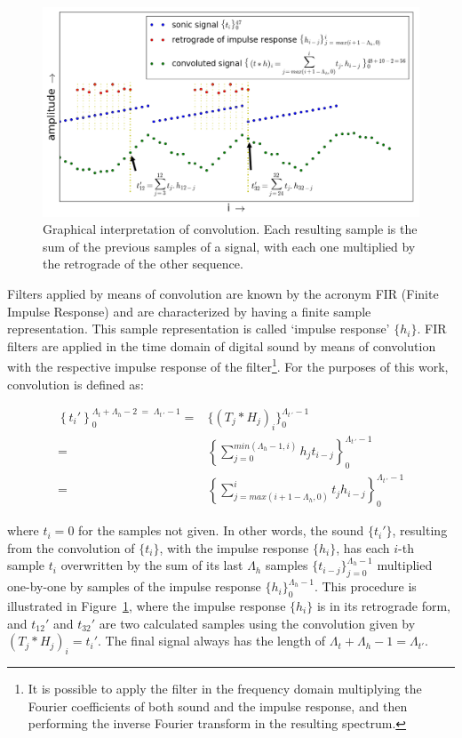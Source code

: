 \begin{figure}
     \centering
         \includegraphics[width=\textwidth]{figures/convolucao_}
     \caption{Graphical interpretation of convolution. Each resulting sample is the sum of the previous samples of a signal, with each one multiplied by the retrograde of the other sequence.}
         \label{fig:conv}
\end{figure}

Filters applied by means of convolution are known by the acronym FIR (Finite Impulse Response) and are characterized by having a finite sample representation. This sample representation is called `impulse response' $\{h_i\}$. FIR filters are applied in the time domain of digital sound by means of convolution with the respective impulse response of the filter\footnote{It is possible to apply the filter in the frequency domain multiplying the Fourier coefficients of both sound and the impulse response, and then performing the inverse Fourier transform in the resulting spectrum.\cite{Openheim}}. For the purposes of this work, convolution is defined as:

\begin{equation}\label{eq:conv}
 \begin{split}
 \left\{t_i'\right\}_0^{\Lambda_t+\Lambda_h-2\; = \;\Lambda_{t\, '}-1} = & \{(T_j*H_j)_i\}_0^{\Lambda_{t \, '}-1} \\ = & \left \{ \sum_{j=0}^{min(\Lambda_h-1,i)}h_{j} t_{i-j} \right \}_0^{\Lambda_{t\, '}-1} 
     \\ = & \left \{ \sum_{j=max(i+1-\Lambda_h,0)}^{i}t_j h_{i-j} \right \}_0^{\Lambda_{t\, '}-1}
 \end{split}
\end{equation}

\noindent where $t_i=0$ for the samples not given.
In other words, the sound $\{t_i'\}$, resulting from the convolution of $\{t_i\}$, with the impulse response $\{h_i\}$, has each $i$-th sample $t_i$ overwritten by the sum of its last $\Lambda_h$ samples $\{t_{i-j}\}_{j=0}^{\Lambda_h-1}$ multiplied one-by-one by samples of the impulse response $\{h_i\}_0^{\Lambda_h-1}$. This procedure is illustrated in Figure~\ref{fig:conv}, where the impulse response $\{h_i\}$ is in its retrograde form, and $t_{12}'$ and $t_{32}'$ are two calculated samples using the convolution given by $(T_j*H_j)_i=t_i'$. The final signal always has the length of $\Lambda_t+\Lambda_h -1=\Lambda_{t'}$.

